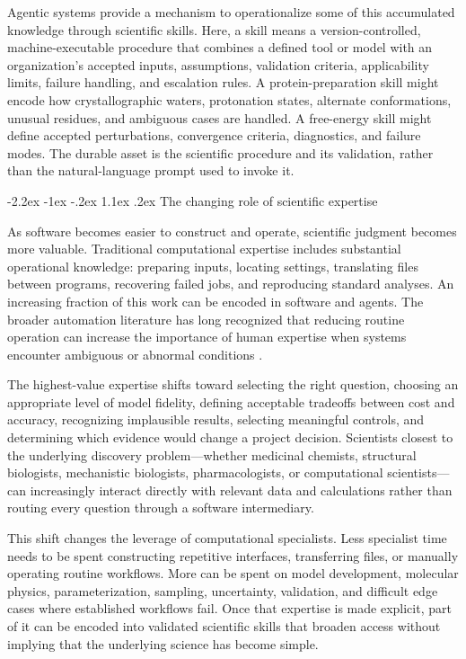 \documentclass[11pt]{article}
\makeatletter
\renewcommand\section{\@startsection{section}{1}{\z@}%
  {-2.2ex \@plus -1ex \@minus -.2ex}%
  {1.1ex \@plus .2ex}%
  {\normalfont\Large\bfseries\color{molblue}}}
\makeatother
\begin{document}
Agentic systems provide a mechanism to operationalize some of this accumulated knowledge through scientific skills. Here, a skill means a version-controlled, machine-executable procedure that combines a defined tool or model with an organization's accepted inputs, assumptions, validation criteria, applicability limits, failure handling, and escalation rules. A protein-preparation skill might encode how crystallographic waters, protonation states, alternate conformations, unusual residues, and ambiguous cases are handled. A free-energy skill might define accepted perturbations, convergence criteria, diagnostics, and failure modes. The durable asset is the scientific procedure and its validation, rather than the natural-language prompt used to invoke it.

\section{The changing role of scientific expertise}

As software becomes easier to construct and operate, scientific judgment becomes more valuable. Traditional computational expertise includes substantial operational knowledge: preparing inputs, locating settings, translating files between programs, recovering failed jobs, and reproducing standard analyses. An increasing fraction of this work can be encoded in software and agents. The broader automation literature has long recognized that reducing routine operation can increase the importance of human expertise when systems encounter ambiguous or abnormal conditions \citep{bainbridge1983ironies}.

The highest-value expertise shifts toward selecting the right question, choosing an appropriate level of model fidelity, defining acceptable tradeoffs between cost and accuracy, recognizing implausible results, selecting meaningful controls, and determining which evidence would change a project decision. Scientists closest to the underlying discovery problem---whether medicinal chemists, structural biologists, mechanistic biologists, pharmacologists, or computational scientists---can increasingly interact directly with relevant data and calculations rather than routing every question through a software intermediary.

This shift changes the leverage of computational specialists. Less specialist time needs to be spent constructing repetitive interfaces, transferring files, or manually operating routine workflows. More can be spent on model development, molecular physics, parameterization, sampling, uncertainty, validation, and difficult edge cases where established workflows fail. Once that expertise is made explicit, part of it can be encoded into validated scientific skills that broaden access without implying that the underlying science has become simple.
\end{document}
